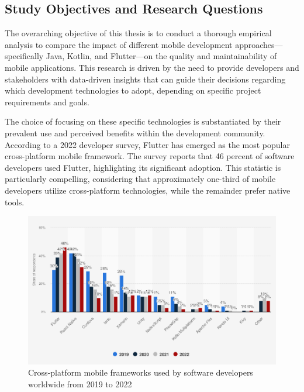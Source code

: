 \subsection{Study Objectives and Research Questions}
The overarching objective of this thesis is to conduct a thorough empirical analysis to compare the impact of different mobile development approaches—specifically Java, Kotlin, and Flutter—on the quality and maintainability of mobile applications. This research is driven by the need to provide developers and stakeholders with data-driven insights that can guide their decisions regarding which development technologies to adopt, depending on specific project requirements and goals. 
\par
The choice of focusing on these specific technologies is substantiated by their prevalent use and perceived benefits within the development community. According to a 2022 developer survey, Flutter has emerged as the most popular cross-platform mobile framework. The survey reports that 46 percent of software developers used Flutter, highlighting its significant adoption. This statistic is particularly compelling, considering that approximately one-third of mobile developers utilize cross-platform technologies, while the remainder prefer native tools.
\begin{figure}[htbp]
    \centering
    \includegraphics[scale = 0.45]{img/cross_platform-sts.png}
    \caption{Cross-platform mobile frameworks used by software developers worldwide from 2019 to 2022\cite{jetbrains2022}}
    \label{fig:cross_platform-sts}
\end{figure}
